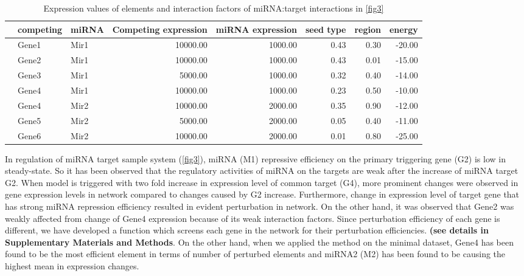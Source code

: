 \documentclass[]{article}
\begin{document}
\begin{table}[ht]
\centering
\caption{Expression values of elements and interaction factors of miRNA:target interactions in \autoref{fig3}} 
\begin{tabular}{rllrrrrr}
  \hline
 & competing & miRNA & Competing expression & miRNA expression & seed type & region & energy \\ 
  \hline
   & Gene1 & Mir1 & 10000.00 & 1000.00 & 0.43 & 0.30 & -20.00 \\ 
   & Gene2 & Mir1 & 10000.00 & 1000.00 & 0.43 & 0.01 & -15.00 \\ 
   & Gene3 & Mir1 & 5000.00 & 1000.00 & 0.32 & 0.40 & -14.00 \\ 
   & Gene4 & Mir1 & 10000.00 & 1000.00 & 0.23 & 0.50 & -10.00 \\ 
   & Gene4 & Mir2 & 10000.00 & 2000.00 & 0.35 & 0.90 & -12.00 \\ 
   & Gene5 & Mir2 & 5000.00 & 2000.00 & 0.05 & 0.40 & -11.00 \\ 
   & Gene6 & Mir2 & 10000.00 & 2000.00 & 0.01 & 0.80 & -25.00 \\ 
   \hline
\end{tabular}
\label{tab:one}
\end{table}

In regulation of miRNA target sample system (\autoref{fig3}), miRNA (M1)
repressive efficiency on the primary triggering gene (G2) is low in
steady-state. So it has been observed that the regulatory activities of
miRNA on the targets are weak after the increase of miRNA target G2.
When model is triggered with two fold increase in expression level of
common target (G4), more prominent changes were observed in gene
expression levels in network compared to changes caused by G2 increase.
Furthermore, change in expression level of target gene that has strong
miRNA repression efficiency resulted in evident perturbation in network.
On the other hand, it was observed that Gene2 was weakly affected from
change of Gene4 expression because of its weak interaction factors.
Since perturbation efficiency of each gene is different, we have
developed a function which screens each gene in the network for their
perturbation efficiencies. \textbf{(see details in Supplementary
Materials and Methods}. On the other hand, when we applied the method on
the minimal dataset, Gene4 has been found to be the most efficient
element in terms of number of perturbed elements and miRNA2 (M2) has
been found to be causing the highest mean in expression changes.
\end{document}
